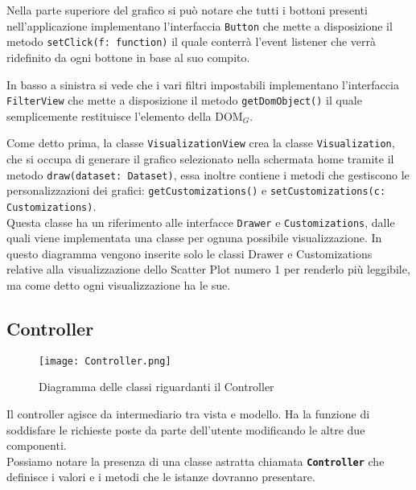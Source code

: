 Nella parte superiore del grafico si può notare che tutti i bottoni presenti nell'applicazione implementano l'interfaccia \texttt{Button} che mette a disposizione il metodo \texttt{setClick(f: function)} il quale conterrà l'event listener che verrà ridefinito da ogni bottone in base al suo compito.

In basso a sinistra si vede che i vari filtri impostabili implementano l'interfaccia \texttt{FilterView} che mette a disposizione il metodo \texttt{getDomObject()} il quale semplicemente restituisce l'elemento della DOM$_G$.

Come detto prima, la classe \texttt{VisualizationView} crea la classe \texttt{Visualization}, che si occupa di generare il grafico selezionato nella schermata home tramite il metodo \texttt{draw(dataset: Dataset)}, essa inoltre contiene i metodi che gestiscono le personalizzazioni dei grafici: \texttt{getCustomizations()} e \texttt{setCustomizations(c: Customizations)}. \\Questa classe ha un riferimento alle interfacce \texttt{Drawer} e \texttt{Customizations}, dalle quali viene implementata una classe per ognuna possibile visualizzazione. In questo diagramma vengono inserite solo le classi Drawer e Customizations relative alla visualizzazione dello Scatter Plot numero 1 per renderlo più leggibile, ma come detto ogni visualizzazione ha le sue.

\subsection{Controller}
\begin{figure}[ht]
	\centering
	\texttt{[image: Controller.png]}
	\caption{Diagramma delle classi riguardanti il Controller}
  \end{figure}
\label{controller}Il controller agisce da intermediario tra vista e modello. Ha la funzione di soddisfare le richieste poste da parte dell'utente modificando le altre due componenti.\\
Possiamo notare la presenza di una classe astratta chiamata \textbf{\texttt{Controller}} che definisce i valori e i metodi che le istanze dovranno presentare.

